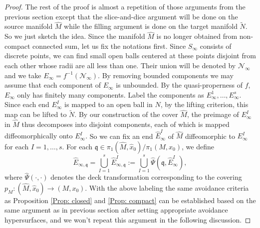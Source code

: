 \documentclass[11pt,letterpaper]{amsart}
\numberwithin{equation}{section}
\theoremstyle{definition}
\begin{document}
\begin{proof}
The rest of the proof is almost a repetition of those arguments from the previous section except that the slice-and-dice argument will be done on the source manifold $\widehat M$ while the filling argument is done on the target manifold $\tilde N$. So we just sketch the idea.
Since the manifold $\widehat M$ is no longer obtained from non-compact connected sum, let us fix the notations first. Since $S_\infty$ consists of discrete points, we can find small open balls centered at these points disjoint from each other whose radii are all less than one. Their union will be denoted by $\mathcal N_\infty$ and we take $E_\infty=f^{-1}(\mathcal N_\infty)$.
By removing bounded components we may assume that each component of $E_\infty$ is unbounded. {By the quasi-properness of $f$, $E_\infty$ only has finitely many components.} Label the components as $E^1_{\infty},\ldots, E_\infty^s$. Since each end $E_\infty^I$ is mapped to an open ball in $N$, {by the lifting criterion, this map can be lifted to $\tilde N$. By our construction of the cover $\widehat M$, the preimage of $E_\infty^I$ in $\widehat M$ thus decomposes into disjoint components, each of which is mapped diffeomorphically onto $E_\infty^I$.} So we can fix an end $\widehat E_\infty^I$ of $\widehat M$ diffeomorphic to $E_\infty^I$ for each $I=1,\ldots,s$.
For each $\mathfrak{q} \in \pi_1(\widehat M,\hat x_0)/\pi_1(M,x_0)$, we define
$$
\widehat E_{\infty,\mathfrak{q}}=\bigcup_{I=1}^s\widehat E_{\infty,\mathfrak{q}}^I:=\bigcup_{I=1}^s\hat\Psi(\mathfrak q,\widehat E_{\infty}^I),
$$
where $\hat\Psi(\cdot,\cdot)$ denotes the deck transformation corresponding to the covering $p_M:(\widehat M,\hat x_0)\to (M,x_0)$. With the above labeling the same avoidance criteria as Proposition \ref{Prop: closed} and \ref{Prop: compact} can be established based on the same argument as in previous section after setting appropriate avoidance hypersurfaces, and we won't repeat this argument in the following discussion.


\end{proof}
\end{document}
